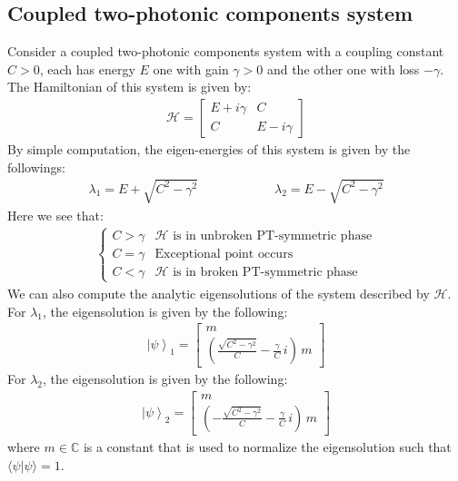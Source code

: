\documentclass[11pt]{book}
\theoremstyle{break}
\theoremstyle{break}
\newcommand{\C}{\mathbb{C}}
\newcommand{\bmat}[1]{\begin{bmatrix} #1 \end{bmatrix}}
\begin{document}
\subsection{Coupled two-photonic components system}
Consider a coupled two-photonic components system with a coupling constant $C > 0$, each has energy $E$ one with gain $\gamma > 0$ and the other one with loss $-\gamma$. The Hamiltonian of this system is given by:
\begin{align*}
\mathcal{H } = \bmat{E+i\gamma & C \\  C & E - i\gamma}
\end{align*}
By simple computation, the eigen-energies of this system is given by the followings:
\begin{align*}
\lambda_1 = E + \sqrt{C^2 -\gamma^2} \qquad\qquad\qquad \lambda_2 = E - \sqrt{C^2 - \gamma^2}
\end{align*}
Here we see that:
\begin{align*}
\begin{cases}
C > \gamma & \mathcal{H} \text{ is in unbroken PT-symmetric phase} \\
C = \gamma & \text{Exceptional point occurs} \\
C < \gamma & \mathcal{H} \text{ is in broken PT-symmetric phase}
\end{cases}
\end{align*}
We can also compute the analytic eigensolutions of the system described by $\mathcal{H}$. \\

For $\lambda_1$, the eigensolution is given by the following:
\begin{align*}
\left|\psi\right>_1 = \bmat{m \\  \left( \frac{\sqrt{C^2 - \gamma^2}}{C}-\frac{\gamma}{C}\, i\right)\, m }
\end{align*}
For $\lambda_2$, the eigensolution is given by the following:
\begin{align*}
\left|\psi\right>_2 = \bmat{m \\  \left(- \frac{\sqrt{C^2 - \gamma^2}}{C}-\frac{\gamma}{C} \, i \right)\, m}
\end{align*}
where $m\in \C$ is a constant that is used to normalize the eigensolution such that $\langle\psi |\psi\rangle = 1$. \\
\end{document}

